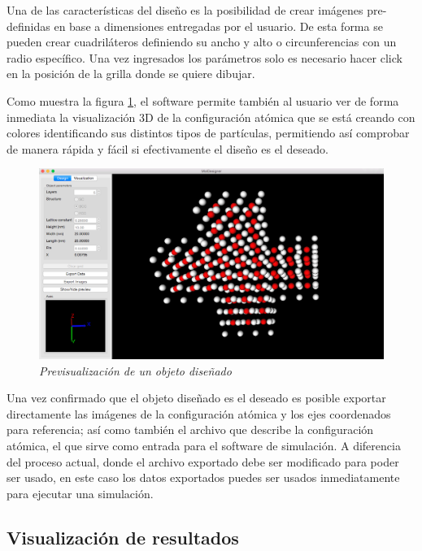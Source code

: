 Una de las características del diseño es la posibilidad de crear imágenes pre-definidas en base a dimensiones entregadas por el usuario. De esta forma se pueden crear cuadriláteros definiendo su ancho y alto o circunferencias con un radio específico. Una vez ingresados los parámetros solo es necesario hacer click en la posición de la grilla donde se quiere dibujar.

Como muestra la figura \ref{softwareDisenoPrevisualizacion}, el software permite también al usuario ver de forma inmediata la visualización 3D de la configuración atómica que se está creando con colores identificando sus distintos tipos de partículas, permitiendo así comprobar de manera rápida y fácil si efectivamente el diseño es el deseado.

\begin{figure}[ht]
  \centering
  \includegraphics[scale=.35]{images/softwareDisenoPrevisualizacion}
  \caption{\em Previsualización de un objeto diseñado}
  \label{softwareDisenoPrevisualizacion}
\end{figure}

Una vez confirmado que el objeto diseñado es el deseado es posible exportar directamente las imágenes de la configuración atómica y los ejes coordenados para referencia; así como también el archivo que describe la configuración atómica, el que sirve como entrada para el software de simulación. A diferencia del proceso actual, donde el archivo exportado debe ser modificado para poder ser usado, en este caso los datos exportados puedes ser usados inmediatamente para ejecutar una simulación.

\subsection{Visualización de resultados}

